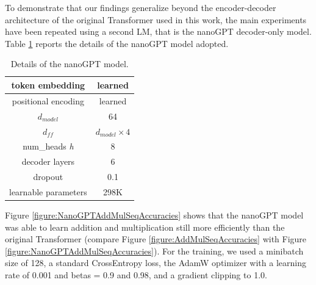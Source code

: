 \documentclass[final,1p,times,authoryear]{elsarticle}
\begin{document}
To demonstrate that our findings generalize beyond the encoder-decoder architecture of the original Transformer used in this work, the main experiments have been repeated using a second LM, that is the nanoGPT \citep{Karpathy2022} decoder-only model. Table \ref{table:NanoGPTDetails} reports the details of the nanoGPT model adopted.

\begin{table}[h!]
\caption{Details of the nanoGPT model.}
\label{table:NanoGPTDetails}
\begin{center}
\begin{tabular}{ |c|c| } 
 \hline
 token embedding & learned \\
 \hline
 positional encoding & learned \\
 \hline
 $d_{model}$ & 64 \\
 \hline
 $d_{ff}$ & $d_{model} \times 4$ \\
 \hline
 num\_heads \textit{h} & 8 \\
 \hline
 decoder layers & 6 \\
 \hline
 dropout & 0.1 \\
 \hline
 learnable parameters & 298K \\
 \hline
\end{tabular}
\end{center}
\end{table}

Figure \ref{figure:NanoGPTAddMulSeqAccuracies} shows that the nanoGPT model was able to learn addition and multiplication still more efficiently than the original Transformer (compare Figure \ref{figure:AddMulSeqAccuracies} with Figure \ref{figure:NanoGPTAddMulSeqAccuracies}). For the training, we used a minibatch size of 128, a standard CrossEntropy loss, the AdamW optimizer with a learning rate of 0.001 and betas = 0.9 and 0.98, and a gradient clipping to 1.0.
\end{document}
